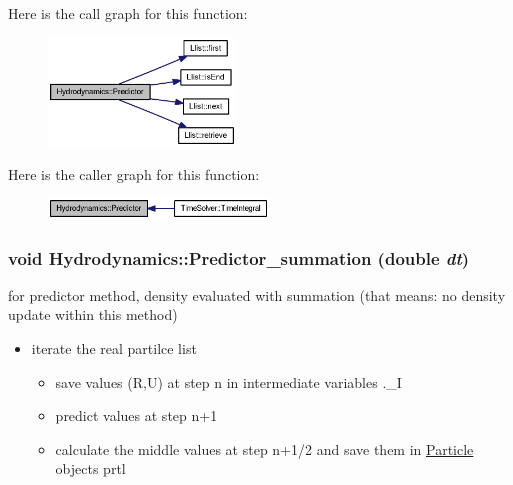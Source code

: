Here is the call graph for this function:\nopagebreak
\begin{figure}[H]
\begin{center}
\leavevmode
\includegraphics[width=141pt]{classHydrodynamics_316a6079bf22102d9b911e2632cd2680_cgraph}
\end{center}
\end{figure}


Here is the caller graph for this function:\nopagebreak
\begin{figure}[H]
\begin{center}
\leavevmode
\includegraphics[width=166pt]{classHydrodynamics_316a6079bf22102d9b911e2632cd2680_icgraph}
\end{center}
\end{figure}
\hypertarget{classHydrodynamics_911fe25b94fec398fad1f2def036d755}{
\subsubsection[{Predictor\_\-summation}]{\setlength{\rightskip}{0pt plus 5cm}void Hydrodynamics::Predictor\_\-summation (double {\em dt})}}
\label{classHydrodynamics_911fe25b94fec398fad1f2def036d755}


for predictor method, density evaluated with summation (that means: no density update within this method) 



\begin{itemize}
\item iterate the real partilce list

\begin{itemize}
\item save values (R,U) at step n in intermediate variables .\_\-I

\item predict values at step n+1

\item calculate the middle values at step n+1/2 and save them in \hyperlink{classParticle}{Particle} objects prtl\end{itemize}
\end{itemize}


